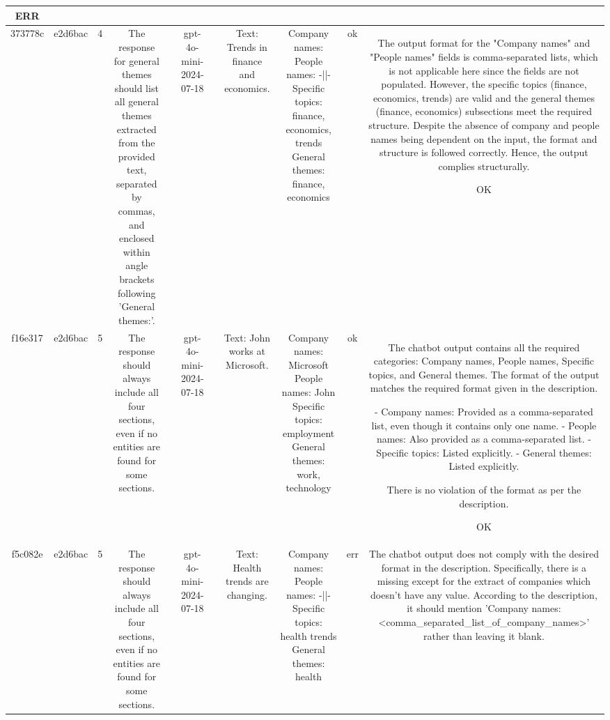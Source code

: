 \begin{table}[h!]
\begin{tabular}{|c|c|c|c|c|c|c|c|c|c|c|}
ERR\\
\hline
373778c & e2d6bac & 4 & The response for general themes should list all general themes extracted from the provided text, separated by commas, and enclosed within angle brackets following 'General themes:'. &  & gpt-4o-mini-2024-07-18 &  & Text: Trends in finance and economics. & Company names: 
People names: -||-
Specific topics: finance, economics, trends
General themes: finance, economics & ok & The output format for the "Company names" and "People names" fields is comma-separated lists, which is not applicable here since the fields are not populated. However, the specific topics (finance, economics, trends) are valid and the general themes (finance, economics) subsections meet the required structure. Despite the absence of company and people names being dependent on the input, the format and structure is followed correctly. Hence, the output complies structurally.

OK\\
\hline
f16e317 & e2d6bac & 5 & The response should always include all four sections, even if no entities are found for some sections. &  & gpt-4o-mini-2024-07-18 &  & Text: John works at Microsoft. & Company names: Microsoft
People names: John
Specific topics: employment
General themes: work, technology & ok & The chatbot output contains all the required categories: Company names, People names, Specific topics, and General themes. The format of the output matches the required format given in the description.

- Company names: Provided as a comma-separated list, even though it contains only one name.
- People names: Also provided as a comma-separated list.
- Specific topics: Listed explicitly.
- General themes: Listed explicitly.

There is no violation of the format as per the description.

OK\\
\hline
f5c082e & e2d6bac & 5 & The response should always include all four sections, even if no entities are found for some sections. &  & gpt-4o-mini-2024-07-18 &  & Text: Health trends are changing. & Company names: 
People names: -||-
Specific topics: health trends
General themes: health & err & The chatbot output does not comply with the desired format in the description. Specifically, there is a missing except for the extract of companies which doesn't have any value. According to the description, it should mention 'Company names: <comma_separated_list_of_company_names>' rather than leaving it blank.


\end{tabular}
\end{table}
